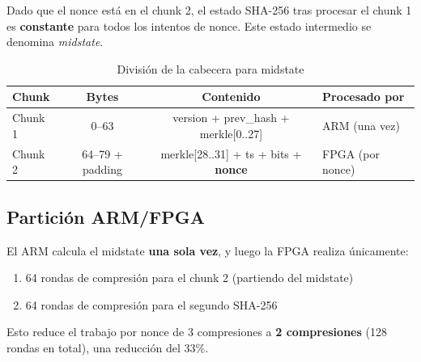\documentclass[12pt,a4paper]{article}
\begin{document}
Dado que el nonce est\'a en el chunk 2, el estado SHA-256 tras procesar el chunk 1
es \textbf{constante} para todos los intentos de nonce. Este estado intermedio se
denomina \textit{midstate}.

\begin{table}[h]
    \centering
    \caption{Divisi\'on de la cabecera para midstate}
    \begin{tabular}{@{}lccl@{}}
        \toprule
        \textbf{Chunk} & \textbf{Bytes} & \textbf{Contenido} & \textbf{Procesado por} \\
        \midrule
        Chunk 1 & 0--63 & version + prev\_hash + merkle[0..27] & ARM (una vez) \\
        Chunk 2 & 64--79 + padding & merkle[28..31] + ts + bits + \textbf{nonce} & FPGA (por nonce) \\
        \bottomrule
    \end{tabular}
\end{table}

\subsection{Partici\'on ARM/FPGA}

El ARM calcula el midstate \textbf{una sola vez}, y luego la FPGA realiza \'unicamente:
\begin{enumerate}[leftmargin=2em]
    \item 64 rondas de compresi\'on para el chunk 2 (partiendo del midstate)
    \item 64 rondas de compresi\'on para el segundo SHA-256
\end{enumerate}

Esto reduce el trabajo por nonce de 3 compresiones a \textbf{2 compresiones}
(128 rondas en total), una reducci\'on del 33\%.
\end{document}
